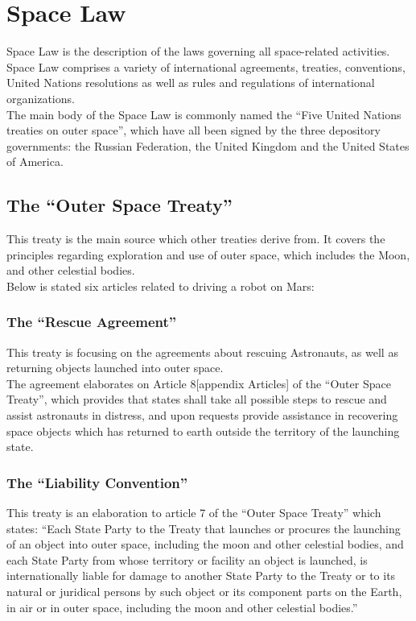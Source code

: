 \chapter{Space Law} \label{ch:Spacelaw}
Space Law is the description of the laws governing all space-related activities.
Space Law comprises a variety of international agreements, treaties, conventions, United Nations resolutions as well as rules and regulations of international organizations.\\
The main body of the Space Law is commonly named the “Five United Nations treaties on outer space”, which have all been signed by the three depository governments: the Russian Federation, the United Kingdom and the United States of America.

\section{The “Outer Space Treaty”}
This treaty is the main source which other treaties derive from. It covers the principles regarding exploration and use of outer space, which includes the Moon, and other celestial bodies.\\
Below is stated six articles related to driving a robot on Mars:

\subsection{The “Rescue Agreement”}
This treaty is focusing on the agreements about rescuing Astronauts, as well as returning objects launched into outer space.\\
The agreement elaborates on Article 8[appendix Articles] of the “Outer Space Treaty”, which provides that states shall take all possible steps to rescue and assist astronauts in distress, and upon requests provide assistance in recovering space objects which has returned to earth outside the territory of the launching state\cite{Treaty2}.

\subsection{The “Liability Convention”}
This treaty is an elaboration to article 7 of the “Outer Space Treaty” which states:
“Each State Party to the Treaty that launches or procures the launching of an object into outer space, including the moon and other celestial bodies, and each State Party from whose territory or facility an object is launched, is internationally liable for damage to another State Party to the Treaty or to its natural or juridical persons by such object or its component parts on the Earth, in air or in outer space, including the moon and other celestial bodies\cite{Treaty3}.”

